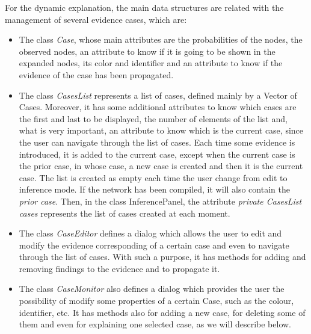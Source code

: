 For the dynamic explanation, the main data structures are related
with the management of several evidence cases, which are:
\begin{itemize}
  \item The class \emph{Case}, whose main attributes are the probabilities of the
  nodes, the observed nodes, an attribute to know if it is going to be shown in the expanded nodes,
  its color and identifier and an attribute to know if the
  evidence of the case has been propagated.
  \item The class \emph{CasesList} represents a list of cases,
  defined mainly by a Vector of Cases. Moreover, it has
  some additional attributes to know which cases are the first and last to be
  displayed, the number of elements of the list and, what is very important, an attribute to know which is the current
  case, since the user can navigate through the list of cases.
  Each time some evidence is introduced, it is added to the current case, except when the current case is the prior case, in whose
  case, a new case is created and then it is the current case. The list is created as empty each time the user change from edit to
  inference mode. If the network has been compiled, it will also
  contain the \emph{prior case}. Then, in the class InferencePanel, the attribute \emph{private
CasesList cases} represents the list of cases created at each
moment.
  \item The class \emph{CaseEditor} defines a dialog which allows the user to edit and
  modify the evidence corresponding of a certain case and even to
  navigate through the list of cases. With such a purpose, it has
  methods for adding and removing findings to the evidence and to
  propagate it.
  \item The class \emph{CaseMonitor} also defines a dialog which
  provides the user the possibility of modify some properties of a
  certain Case, such as the colour, identifier, etc. It has
  methods also for adding a new case, for deleting some of them
  and even for explaining one selected case, as we will describe below.
\end{itemize}

